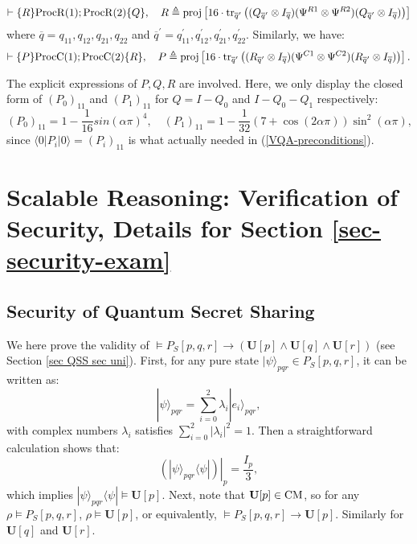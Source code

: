 \documentclass[conference,compsoc, 10pt]{IEEEtran}
\newcommand {\qbar} {{\overline{q}}}
\newcommand {\id } {{I}}
\newcommand {\rt }[2] {{\left.{#1}\right|_{#2}}}
\newcommand {\tr } {{\mathrm{tr}}}
\newcommand {\unia } {{\mathbf{U}}}
\def\>{\ensuremath{\rangle}}
\def\<{\ensuremath{\langle}}
\newcommand{\proj}{{\mathrm{proj}}}
\begin{document}
\begin{appendices}
		$$\vdash\{R\}{\rm ProcR}(1);{\rm ProcR}(2)\{Q\},\quad R\triangleq \proj\left[16\cdot\tr_{\qbar^\prime}\left((Q_{\qbar^\prime}\otimes\id_{\qbar})(\Psi^{R1}\otimes\Psi^{R2})(Q_{\qbar^\prime}\otimes\id_{\qbar})\right)\right]$$
		where $\qbar = q_{11},q_{12},q_{21},q_{22}$ and $\qbar^\prime = q_{11}^\prime,q_{12}^\prime,q_{21}^\prime,q_{22}^\prime$. Similarly, we have:
		$$\vdash\{P\}{\rm ProcC}(1);{\rm ProcC}(2)\{R\},\quad P\triangleq \proj\left[16\cdot\tr_{\qbar^\prime}\left((R_{\qbar^\prime}\otimes\id_{\qbar})(\Psi^{C1}\otimes\Psi^{C2})(R_{\qbar^\prime}\otimes\id_{\qbar})\right)\right].$$
		
		The explicit expressions of $P,Q,R$ are involved. Here, we only display the closed form of $(P_0)_{11}$ and $(P_1)_{11}$ for $Q = \id - Q_0$ and $\id - Q_0 - Q_1$ respectively:
		$$(P_0)_{11} = 1-\frac{1}{16}sin(\alpha\pi)^4,\quad (P_1)_{11} =1-\frac{1}{32}(7+\cos(2\alpha\pi))\sin^2(\alpha\pi),$$
		since $\<0|P_i|0\> = (P_i)_{11}$ is what actually needed in (\ref{VQA-preconditions}).
		
		
		\section{Scalable Reasoning: Verification of Security, Details for Section \ref{sec-security-exam}}
		
		\subsection{Security of Quantum Secret Sharing}
		
		We here prove the validity of $\models P_S[p,q,r]\rightarrow (\unia[p]\wedge \unia[q]\wedge \unia[r])$ (see Section \ref{sec QSS sec uni}). First, for any pure state $|\psi\>_{pqr}\in P_S[p,q,r]$, it can be written as:
		$$|\psi\>_{pqr} = \sum_{i=0}^2\lambda_i|e_i\>_{pqr},$$
		with complex numbers $\lambda_i$ satisfies $\sum_{i=0}^2|\lambda_i|^2 = 1$. Then a straightforward calculation shows that:
		$$\rt{\left(|\psi\>_{pqr}\<\psi|\right)}{p} = \frac{\id_p}{3},$$
		which implies $|\psi\>_{pqr}\<\psi|\models\unia[p]$. Next, note that $\unia[p]\in{\rm CM}$, so for any $\rho\models P_S[p,q,r]$, $\rho\models\unia[p]$, or equivalently, $\models P_S[p,q,r]\rightarrow \unia[p]$. Similarly for $\unia[q]$ and $\unia[r]$.
		
		

\end{appendices}
\end{document}
